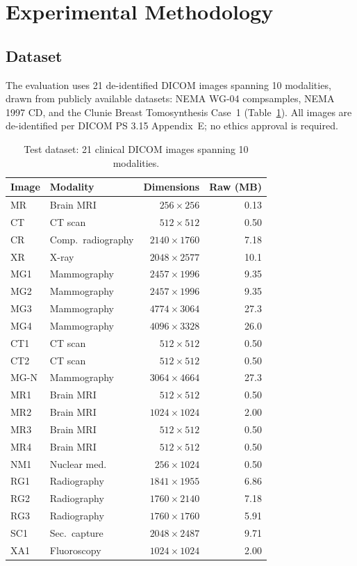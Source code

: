 \documentclass[journal]{IEEEtran}
\begin{document}
\section{Experimental Methodology}
\label{sec:methodology}

\subsection{Dataset}

The evaluation uses 21 de-identified DICOM images spanning 10 modalities, drawn
from publicly available datasets: NEMA WG-04 compsamples, NEMA 1997 CD, and the
Clunie Breast Tomosynthesis Case~1 (Table~\ref{tab:dataset}). All images are
de-identified per DICOM PS 3.15 Appendix~E; no ethics approval is required.

\begin{table}[htbp]
\centering
\caption{Test dataset: 21 clinical DICOM images spanning 10 modalities.}
\label{tab:dataset}
\scriptsize
\begin{tabular}{llrr}
\toprule
Image & Modality & Dimensions & Raw (MB) \\
\midrule
MR   & Brain MRI      & $256{\times}256$   & 0.13 \\
CT   & CT scan        & $512{\times}512$   & 0.50 \\
CR   & Comp.\ radiography & $2140{\times}1760$ & 7.18 \\
XR   & X-ray          & $2048{\times}2577$ & 10.1 \\
MG1  & Mammography    & $2457{\times}1996$ & 9.35 \\
MG2  & Mammography    & $2457{\times}1996$ & 9.35 \\
MG3  & Mammography    & $4774{\times}3064$ & 27.3 \\
MG4  & Mammography    & $4096{\times}3328$ & 26.0 \\
CT1  & CT scan        & $512{\times}512$   & 0.50 \\
CT2  & CT scan        & $512{\times}512$   & 0.50 \\
MG-N & Mammography    & $3064{\times}4664$ & 27.3 \\
MR1  & Brain MRI      & $512{\times}512$   & 0.50 \\
MR2  & Brain MRI      & $1024{\times}1024$ & 2.00 \\
MR3  & Brain MRI      & $512{\times}512$   & 0.50 \\
MR4  & Brain MRI      & $512{\times}512$   & 0.50 \\
NM1  & Nuclear med.   & $256{\times}1024$  & 0.50 \\
RG1  & Radiography    & $1841{\times}1955$ & 6.86 \\
RG2  & Radiography    & $1760{\times}2140$ & 7.18 \\
RG3  & Radiography    & $1760{\times}1760$ & 5.91 \\
SC1  & Sec.~capture   & $2048{\times}2487$ & 9.71 \\
XA1  & Fluoroscopy    & $1024{\times}1024$ & 2.00 \\
\bottomrule
\end{tabular}
\end{table}
\end{document}
